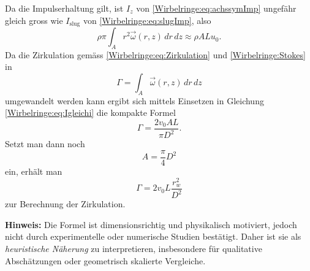 Da die Impulserhaltung gilt, ist \(I_z\) von \eqref{Wirbelringe:eq:achssymImp} ungefähr gleich gross wie \(I_{\text{slug}}\) von \eqref{Wirbelringe:eq:slugImp}, also
\begin{equation}
    \rho\pi\int_{A}r^2\vec{\omega}(r,z)\,dr\,dz
    \approx
    \rho ALu_0
    \label{Wirbelringe:eq:Igleichi}.
\end{equation}
Da die Zirkulation gemäss \eqref{Wirbelringe:eq:Zirkulation} und \ref{Wirbelringe:Stokes} in
\begin{equation*}
    \Gamma
    =
    \int_{A}\vec{\omega}(r,z)\,dr\,dz
\end{equation*}
umgewandelt werden kann ergibt sich mittels Einsetzen in Gleichung \eqref{Wirbelringe:eq:Igleichi} die kompakte Formel
\begin{equation*}
    \Gamma
    =
    \frac{2v_0AL}{\pi D^2}.
\end{equation*}
Setzt man dann noch
\begin{equation*}
    A
    =
    \frac{\pi}{4} D^2
\end{equation*}
ein, erhält man
\begin{equation}
    \label{Wirbelringe:eq:naeherungZirkulation}
    \Gamma
    =
    2v_0L\frac{r_w^2}{D^2}
\end{equation}
zur Berechnung der Zirkulation.

\textbf{Hinweis:}
Die Formel ist dimensionsrichtig und physikalisch motiviert, jedoch nicht durch experimentelle oder numerische Studien bestätigt.
Daher ist sie als \emph{heuristische Näherung} zu interpretieren, insbesondere für qualitative Abschätzungen oder geometrisch skalierte Vergleiche.